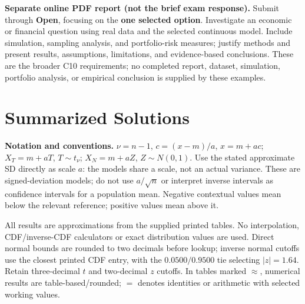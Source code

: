 {\textbf{Separate online PDF report (not the brief exam response).}
Submit through \textbf{Open}, focusing on the \textbf{one selected option}.
Investigate an economic or financial question using real data and the selected continuous model.
Include simulation, sampling analysis, and portfolio-risk measures; justify methods and present results,
assumptions, limitations, and evidence-based conclusions. These are the broader C10 requirements;
no completed report, dataset, simulation, portfolio analysis, or empirical conclusion is supplied by these examples.

\secInicio[sec:q17]
}

\newpage
\section{Summarized Solutions}
\begingroup
\small
\setlength{\parskip}{5pt}
\setlength{\tabcolsep}{5pt}
\renewcommand{\arraystretch}{1.22}
\textbf{Notation and conventions.}
$\nu=n-1$, $c=(x-m)/a$, $x=m+ac$;
$X_T=m+aT$, $T\sim t_\nu$; $X_N=m+aZ$, $Z\sim N(0,1)$.
Use the stated approximate SD directly as scale $a$: the models share a scale,
not an actual variance. These are signed-deviation models; do not use
$a/\sqrt n$ or interpret inverse intervals as confidence intervals for a population mean.
Negative contextual values mean below the relevant reference; positive values mean above it.

All results are approximations from the supplied printed tables. No interpolation,
CDF/inverse-CDF calculators or exact distribution values are used.
Direct normal bounds are rounded to two decimals before lookup; inverse normal
cutoffs use the closest printed CDF entry, with the $0.0500/0.9500$ tie selecting
$|z|=1.64$. Retain three-decimal $t$ and two-decimal $z$ cutoffs.
In tables marked $\approx$, numerical results are table-based/rounded;
$=$ denotes identities or arithmetic with selected working values.

